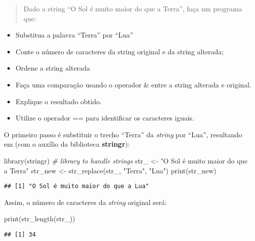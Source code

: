 \documentclass[
]{article}
\newenvironment{Shaded}{\begin{snugshade}}{\end{snugshade}}
\newcommand{\CommentTok}[1]{\textcolor[rgb]{0.56,0.35,0.01}{\textit{#1}}}
\newcommand{\FunctionTok}[1]{\textcolor[rgb]{0.00,0.00,0.00}{#1}}
\newcommand{\NormalTok}[1]{#1}
\newcommand{\OtherTok}[1]{\textcolor[rgb]{0.56,0.35,0.01}{#1}}
\newcommand{\StringTok}[1]{\textcolor[rgb]{0.31,0.60,0.02}{#1}}
\providecommand{\tightlist}{%
  \setlength{\itemsep}{0pt}\setlength{\parskip}{0pt}}
\begin{document}
\begin{quote}
Dado a string ``O Sol é muito maior do que a Terra'', faça um programa
que:
\end{quote}

\begin{itemize}
\tightlist
\item
  Substitua a palavra ``Terra'' por ``Lua''
\item
  Conte o número de caracteres da string original e da string alterada;
\item
  Ordene a string alterada
\item
  Faça uma comparação usando o operador \& entre a string alterada e
  original.
\item
  Explique o resultado obtido.
\item
  Utilize o operador == para identificar os caracteres iguais.
\end{itemize}

O primeiro passo é substituir o trecho ``Terra'' da \emph{string} por
``Lua'', resultando em (com o auxílio da biblioteca \textbf{stringr}):

\begin{Shaded}
\begin{Highlighting}[]
\FunctionTok{library}\NormalTok{(stringr) }\CommentTok{\# library to handle strings}
\NormalTok{str\_ }\OtherTok{\textless{}{-}} \StringTok{"O Sol é muito maior do que a Terra"}
\NormalTok{str\_new }\OtherTok{\textless{}{-}} \FunctionTok{str\_replace}\NormalTok{(str\_, }\StringTok{"Terra"}\NormalTok{, }\StringTok{"Lua"}\NormalTok{)}
\FunctionTok{print}\NormalTok{(str\_new)}
\end{Highlighting}
\end{Shaded}

\begin{verbatim}
## [1] "O Sol é muito maior do que a Lua"
\end{verbatim}

Assim, o número de caracteres da \emph{string} original será:

\begin{Shaded}
\begin{Highlighting}[]
\FunctionTok{print}\NormalTok{(}\FunctionTok{str\_length}\NormalTok{(str\_))}
\end{Highlighting}
\end{Shaded}

\begin{verbatim}
## [1] 34
\end{verbatim}
\end{document}
